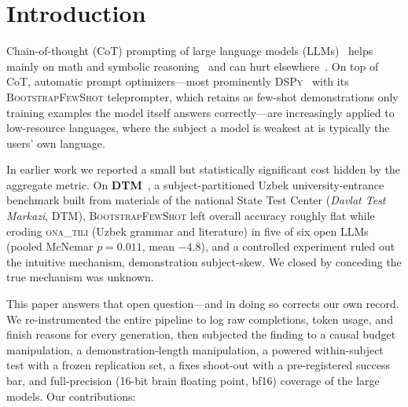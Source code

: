 \documentclass[11pt]{article}
\newcommand{\ona}{\textsc{ona\_tili}}
\newcommand{\bsfs}{\textsc{BootstrapFewShot}}
\begin{document}
\begin{abstract}
original stack---yet the absolute native drop is null ($p{=}1.0$) and $35$ of $37$
Turkish native losses are well-formed, in-budget answers that our repair cannot touch. A second, content-side
route to the same harm therefore exists, and we do not explain it. Finally,
(7) the differential is \emph{not} a \bsfs{} artifact: \textsc{MIPROv2}, which searches
instructions rather than selecting correct demonstrations, reproduces it at the same
magnitude on the same stack ($1.75$ vs.\ $1.63$). It also confirms the mechanism from
the opposite side---its \emph{more} verbose demonstrations produce a quarter of the
format failures, because the instruction it writes enforces the format they violate,
which implies a second repair. We release the instrumented harness, per-item logs for
every number, and a frozen replication set.
\end{abstract}

\section{Introduction}
Chain-of-thought (CoT) prompting of large language models (LLMs)~\citep{wei2022cot}
helps mainly on math and symbolic reasoning~\citep{sprague2025cot} and can hurt
elsewhere~\citep{liu2025mind}. On top of
CoT, automatic prompt optimizers---most prominently
\textsc{DSPy}~\citep{khattab2024dspy} with its \bsfs{} teleprompter, which retains as
few-shot demonstrations only training examples the model itself answers
correctly---are increasingly applied to low-resource languages, where the subject a
model is weakest at is typically the users' own language.

In earlier work we reported a small but statistically significant cost hidden by the
aggregate metric. On \textbf{DTM}~\citep{dtm2026}, a subject-partitioned Uzbek
university-entrance benchmark built from materials of the national State Test Center
(\emph{Davlat Test Markazi}, DTM), \bsfs{} left overall accuracy roughly flat while
eroding \ona{} (Uzbek grammar and literature) in five of six open LLMs (pooled McNemar
$p{=}0.011$, mean $-4.8$), and a controlled experiment ruled out the intuitive
mechanism, demonstration subject-skew. We closed by conceding the true mechanism was
unknown.

This paper answers that open question---and in doing so corrects our own record. We
re-instrumented the entire pipeline to log raw completions, token usage, and finish
reasons for every generation, then subjected the finding to a causal budget
manipulation, a demonstration-length manipulation, a powered within-subject test with
a frozen replication set, a fixes shoot-out with a pre-registered success bar, and
full-precision (16-bit brain floating point, bf16) coverage of the large models. Our contributions:
\end{document}

